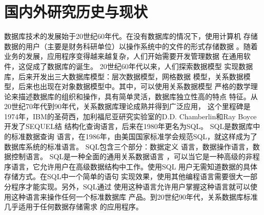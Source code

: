 \section{国内外研究历史与现状}
数据库技术的发展始于20世纪60年代。在没有数据库的情况下，使用计算机
存储数据的用户（主要是财务科研单位）以操作系统中的文件的形式存储数据
。随着业务的发展，应用程序变得越来越复杂，人们开始需要开发管理数据
在通用软件，这促成了数据库的诞生。 20世纪60年代以来，人们探索数据模型
实现数据库，后来开发出三大数据库模型：层次数据模型，网格数据
模型，关系数据模型，后来也出现在对象数据模型中。其中，可以使用关系数据模型
严格的数学理论来描述数据库的组织和操作，具有简单灵活，数据库独立性高的特点
特征。从20世纪70年代到90年代，关系数据库理论成熟并得到广泛应用，
这个里程碑是1974年，IBM的圣荷西，加利福尼亚研究实验室的D.D.
Chamberlin和Ray Boyce开发了SEQUEL结
结构化查询语言，后来在1980年更名为SQL。 SQL是数据库中的标准数据查询
语言，在1986年，由美国国家标准学会规范SQL，就这样成为了
数据库系统的标准语言。 SQL包含三个部分：数据定义
语言，数据操作语言，数据控制语言。 SQL是一种全面的通用关系数据语言
，可以当它是一种高级的非程序语言，它允许用户在高级数据结构中工作。使用SQL
用户无需知道数据的具体存储方式。在SQL中一个简单的语句
实现效果，使用其他编程语言需要很大一部分程序才能实现。另外，SQL通过
使用这种语言允许用户掌握这种语言就可以使用这种语言来操作任何一个标准数据库
产品。到20世纪90年代，关系数据库标准几乎适用于任何数据存储需求
的应用程序。

